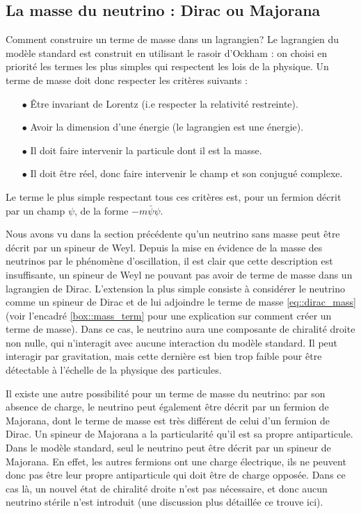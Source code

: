         \subsection{La masse du neutrino : Dirac ou Majorana}\label{sec::dirac_majorana}
        
	      \begin{activitybox}[label=box::mass_term]{Comment construire un terme de masse dans un lagrangien?}
	        	Le lagrangien du modèle standard est construit en utilisant le rasoir d'Ockham : on choisi en priorité les termes les plus simples qui respectent les lois de la physique. Un terme de masse doit donc respecter les critères suivants :
	        	\begin{itemize}
					\item[$\bullet$] Être invariant de Lorentz (i.e respecter la relativité restreinte).
					\item[$\bullet$] Avoir la dimension d'une énergie (le lagrangien est une énergie).
					\item[$\bullet$] Il doit faire intervenir la particule dont il est la masse.
					\item[$\bullet$] Il doit être réel, donc faire intervenir le champ et son conjugué complexe.
	        	\end{itemize}
	        	Le terme le plus simple respectant tous ces critères est, pour un fermion décrit par un champ $\psi$, de la forme $-m\bar{\psi}\psi$.
        	\end{activitybox}
	        
	        Nous avons vu dans la section précédente qu'un neutrino sans masse peut être décrit par un spineur de Weyl. Depuis la mise en évidence de la masse des neutrinos par le phénomène d'oscillation, il est clair que cette description est insuffisante, un spineur de Weyl ne pouvant pas avoir de terme de masse dans un lagrangien de Dirac. L'extension la plus simple consiste à considérer le neutrino comme un spineur de Dirac et de lui adjoindre le terme de masse \eqref{eq::dirac_mass} (voir l'encadré \ref{box::mass_term} pour une explication sur comment créer un terme de masse). Dans ce cas, le neutrino aura une composante de chiralité droite non nulle, qui n'interagit avec aucune interaction du modèle standard. Il peut interagir par gravitation, mais cette dernière est bien trop faible pour être détectable à l'échelle de la physique des particules. 
	        
	        Il existe une autre possibilité pour un terme de masse du neutrino: par son absence de charge, le neutrino peut également être décrit par un fermion de Majorana, dont le terme de masse est très différent de celui d'un fermion de Dirac. Un spineur de Majorana a la particularité qu'il est sa propre antiparticule. Dans le modèle standard, seul le neutrino peut être décrit par un spineur de Majorana. En effet, les autres fermions ont une charge électrique, ils ne peuvent donc pas être leur propre antiparticule qui doit être de charge opposée. Dans ce cas là, un nouvel état de chiralité droite n'est pas nécessaire, et donc aucun neutrino stérile n'est introduit (une discussion plus détaillée ce trouve ici\cite{Petcov2013}).
	        
